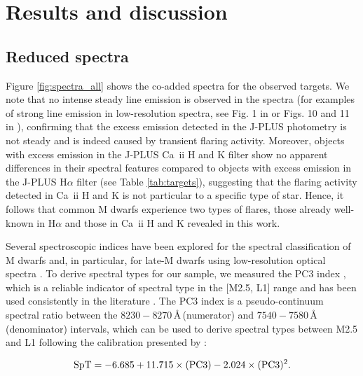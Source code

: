 

\section{Results and discussion}
\label{sec:results}

\subsection{Reduced spectra}
\label{sec:reduced_sp}


Figure \ref{fig:spectra_all} shows the co-added spectra for the observed targets. We note that no intense steady line emission is observed in the spectra (for examples of strong line emission in low-resolution spectra, see Fig. 1 in \citealp{Burgasser2011} or Figs. 10 and 11 in \citealp{Schmidt2007}), confirming that the excess emission detected in the J-PLUS photometry is not steady and is indeed caused by transient flaring activity. Moreover, objects with excess emission in the J-PLUS Ca~{\sc ii} H and K filter show no apparent differences in their spectral features compared to objects with excess emission in the J-PLUS H$\alpha$ filter (see Table \ref{tab:targets}), suggesting that the flaring activity detected in Ca~{\sc ii} H and K is not particular to a specific type of star. Hence, it follows that common M dwarfs experience two types of flares, those already well-known in H$\alpha$ and those in Ca~{\sc ii} H and K revealed in this work.

Several spectroscopic indices have been explored for the spectral classification of M dwarfs \citep{lepine2003} and, in particular, for late-M dwarfs using low-resolution optical spectra \citep{kirkpatrick1995, martin1996, martin1999b}. To derive spectral types for our sample, we measured the PC3 index \citep{martin1999b}, which is a reliable indicator of spectral type in the [M2.5, L1] range and has been used consistently in the literature \citep{crifo2005,martin2006,Martin2010,phanbao2006,reyle2006,phanbao2008}. The PC3 index is a pseudo-continuum spectral ratio between the $8230-8270$\,\AA\,(numerator) and $7540-7580$\,\AA\,(denominator) intervals, which can be used to derive spectral types between M2.5 and L1 following the calibration presented by \citet{martin1999b}:

\begin{equation}
    \rm{SpT}=-6.685+11.715\times (\rm PC3)-2.024\times (\rm PC3)^2.
    \label{eq:ffd}
\end{equation}

